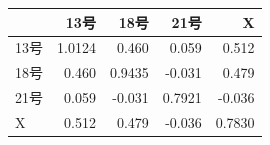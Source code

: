 \begin{tabular}{lrrrr}
\toprule
& 13号 & 18号 & 21号 & X \\
\midrule
13号 & 1.0124 & 0.460 & 0.059 & 0.512 \\
18号 & 0.460 & 0.9435 & -0.031 & 0.479 \\
21号 & 0.059 & -0.031 & 0.7921 & -0.036 \\
X & 0.512 & 0.479 & -0.036 & 0.7830 \\
\bottomrule
\end{tabular}
